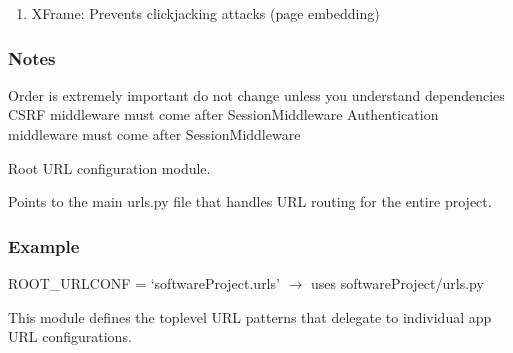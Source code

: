 \documentclass[letterpaper,10pt,english]{sphinxmanual}
\begin{document}
\begin{fulllineitems}
\begin{description}
\begin{enumerate}
\item {} 
\sphinxAtStartPar
XFrame: Prevents clickjacking attacks (page embedding)

\end{enumerate}

\end{description}
\subsubsection*{Notes}

\sphinxAtStartPar
Order is extremely important \sphinxhyphen{} do not change unless you understand dependencies
CSRF middleware must come after SessionMiddleware
Authentication middleware must come after SessionMiddleware

\end{fulllineitems}


\begin{fulllineitems}
\label{\detokenize{softwareProject:softwareProject.settings.ROOT_URLCONF}}
\pysigstartsignatures
\pysigline
{}
\pysigstopsignatures
\sphinxAtStartPar
Root URL configuration module.

\sphinxAtStartPar
Points to the main urls.py file that handles URL routing for the entire project.
\subsubsection*{Example}

\sphinxAtStartPar
ROOT\_URLCONF = ‘softwareProject.urls’ \(\rightarrow\) uses softwareProject/urls.py
\begin{description}
\sphinxAtStartPar
This module defines the top\sphinxhyphen{}level URL patterns that delegate
to individual app URL configurations.

\end{description}

\end{fulllineitems}

\end{document}
